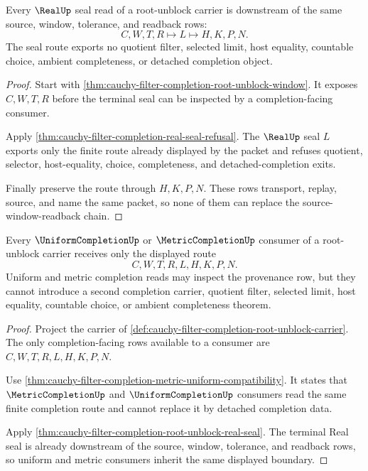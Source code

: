 \begin{theorem}
\label{thm:cauchy-filter-completion-root-unblock-real-seal}
Every $\RealUp$ seal read of a root-unblock carrier is downstream of the same source, window, tolerance, and readback rows:
$$
C,W,T,R \longmapsto L \longmapsto H,K,P,N .
$$
The seal route exports no quotient filter, selected limit, host equality, countable choice, ambient completeness, or detached completion object.
\end{theorem}
\begin{proof}
Start with \autoref{thm:cauchy-filter-completion-root-unblock-window}. It exposes $C,W,T,R$ before the terminal seal can be inspected by a completion-facing consumer.

Apply \autoref{thm:cauchy-filter-completion-real-seal-refusal}. The $\RealUp$ seal $L$ exports only the finite route already displayed by the packet and refuses quotient, selector, host-equality, choice, completeness, and detached-completion exits.

Finally preserve the route through $H,K,P,N$. These rows transport, replay, source, and name the same packet, so none of them can replace the source-window-readback chain.
\end{proof}

\begin{theorem}
\label{thm:cauchy-filter-completion-root-unblock-uniform-route}
Every $\UniformCompletionUp$ or $\MetricCompletionUp$ consumer of a root-unblock carrier receives only the displayed route
$$
C,W,T,R,L,H,K,P,N .
$$
Uniform and metric completion reads may inspect the provenance row, but they cannot introduce a second completion carrier, quotient filter, selected limit, host equality, countable choice, or ambient completeness theorem.
\end{theorem}
\begin{proof}
Project the carrier of \autoref{def:cauchy-filter-completion-root-unblock-carrier}. The only completion-facing rows available to a consumer are $C,W,T,R,L,H,K,P,N$.

Use \autoref{thm:cauchy-filter-completion-metric-uniform-compatibility}. It states that $\MetricCompletionUp$ and $\UniformCompletionUp$ consumers read the same finite completion route and cannot replace it by detached completion data.

Apply \autoref{thm:cauchy-filter-completion-root-unblock-real-seal}. The terminal Real seal is already downstream of the source, window, tolerance, and readback rows, so uniform and metric consumers inherit the same displayed boundary.
\end{proof}

